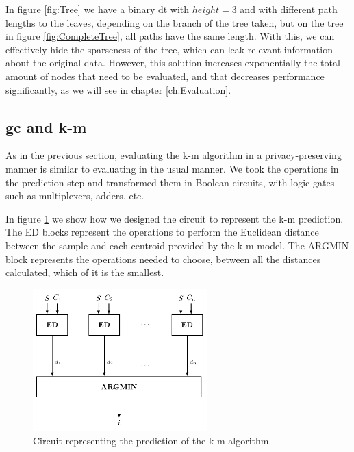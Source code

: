 In figure \ref{fig:Tree} we have a binary \ac{dt} with $height=3$ and with different path lengths to the leaves, depending on the branch of the tree taken, but on the tree in figure \ref{fig:CompleteTree}, all paths have the same length. With this, we can effectively hide the sparseness of the tree, which can leak relevant information about the original data. However, this solution increases exponentially the total amount of nodes that need to be evaluated, and that decreases performance significantly, as we will see in chapter \ref{ch:Evaluation}.
                


\subsection{\acl{gc} and \acl{k-m}}
\label{ssec:GCandk-M}



As in the previous section, evaluating the \ac{k-m} algorithm in a privacy-preserving manner is similar to evaluating in the usual manner. We took the operations in the prediction step and transformed them in Boolean circuits, with logic gates such as multiplexers, adders, etc.

In figure \ref{fig:kmeans} we show how we designed the circuit to represent the \ac{k-m} prediction. The ED blocks represent the operations to perform the Euclidean distance between the sample and each centroid provided by the \ac{k-m} model. The ARGMIN block represents the operations needed to choose, between all the distances calculated, which of it is the smallest.


\begin{figure}[H]
  \centering
  \includegraphics[width=0.60\textwidth]{images/k-means.pdf}
  \caption{Circuit representing the prediction of the \ac{k-m} algorithm.}
  \label{fig:kmeans}
\end{figure}


